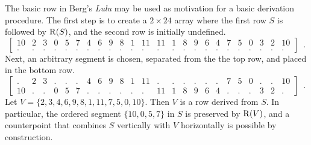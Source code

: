 \begin{example}
The basic row in Berg's \emph{Lulu} \cite[182]{Starr1984} may be used as motivation for a basic derivation procedure. The first step is to create a $2 \times 24$ array where the first row $S$ is followed by $\operatorname{R}(S)$, and the second row is initially undefined.
\begin{equation}
    \left[
    \begin{array}{cccccccccccc|cccccccccccc}
    10 & 2 & 3 & 0 & 5 & 7 & 4 & 6 & 9 & 8 & 1 & 11 & 11 & 1 & 8 & 9 & 6 & 4 & 7 & 5 & 0 & 3 & 2 & 10 \\
    . & . & . & . & . & . & . & . & . & . & . & . & . & . & . & . & . & . & . & . & . & . & . & .
    \end{array}
    \right] \enspace.
\end{equation}
Next, an arbitrary segment is chosen, separated from the the top row, and placed in the bottom row.
\begin{equation}
    \left[
    \begin{array}{cccccccccccc|cccccccccccc}
    . & 2 & 3 & . & . & . & 4 & 6 & 9 & 8 & 1 & 11 & . & . & . & . & . & . & 7 & 5 & 0 & . & . & 10 \\
    10 & . & . & 0 & 5 & 7 & . & . & . & . & . & . & 11 & 1 & 8 & 9 & 6 & 4 & . & . & . & 3 & 2 & .
    \end{array}
    \right] \enspace.
\end{equation}
Let $V = \{ 2, 3, 4, 6, 9, 8, 1, 11, 7, 5, 0, 10 \}$. Then $V$ is a row derived from $S$. In particular, the ordered segment $\{ 10, 0, 5, 7 \}$ in $S$ is preserved by $\operatorname{R}(V)$, and a counterpoint that combines $S$ vertically with $V$ horizontally is possible by construction.
\label{ex:derivation}
\end{example}

